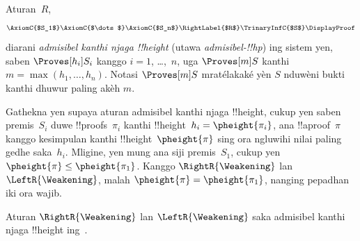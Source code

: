 \documentclass[../../../include/open-logic-section]{subfiles}
\begin{document}
\begin{defn}
Aturan~$R$,
\[
\AxiomC{$S_1$}
\AxiomC{$\dots$}
\AxiomC{$S_n$}
\RightLabel{$R$}
\TrinaryInfC{$S$}
\DisplayProof
\]
diarani \emph{admisibel kanthi njaga !!{height}} (utawa
\emph{admisibel-!!{hp}}) ing sistem yen, saben $\Proves[h_i] S_i$
kanggo $i = 1$, \dots,~$n$, uga $\Proves[m] S$ kanthi
$m = \max(h_1, \dots, h_n)$. Notasi $\Proves[m] S$ mratélakaké
yèn $S$ nduwèni bukti kanthi dhuwur paling akèh $m$.
\end{defn}

Gathekna yen supaya aturan admisibel kanthi njaga !!{height}, cukup
yen saben premis~$S_i$ duwe !!{proof}s~$\pi_i$ kanthi
!!{height}~$h_i = \pheight{\pi_i}$, ana !!a{proof}~$\pi$ kanggo
kesimpulan kanthi !!{height}~$\pheight{\pi}$ sing ora ngluwihi nilai
paling gedhe saka~$h_i$. Mligine, yen mung ana siji premis~$S_1$,
cukup yen $\pheight{\pi} \le \pheight{\pi_1}$. Kanggo
$\RightR{\Weakening}$ lan $\LeftR{\Weakening}$, malah
$\pheight{\pi} = \pheight{\pi_1}$, nanging pepadhan iki ora wajib.

\begin{prop}
Aturan $\RightR{\Weakening}$ lan $\LeftR{\Weakening}$ saka 
admisibel kanthi njaga !!{height} ing~.
\end{prop}
\end{document}
